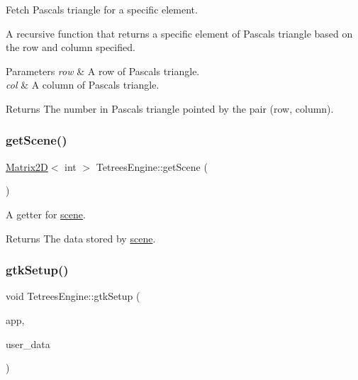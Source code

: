 Fetch Pascal\textquotesingle{}s triangle for a specific element. 

A recursive function that returns a specific element of Pascal\textquotesingle{}s triangle based on the row and column specified. 
\begin{DoxyParams}{Parameters}
{\em row} & A row of Pascal\textquotesingle{}s triangle. \\
\hline
{\em col} & A column of Pascal\textquotesingle{}s triangle. \\
\hline
\end{DoxyParams}
\begin{DoxyReturn}{Returns}
The number in Pascal\textquotesingle{}s triangle pointed by the pair (row, column). 
\end{DoxyReturn}
\mbox{\label{classTetreesEngine_a1f167b42fc077d496449a2cc959989ac}} 
\subsubsection{\texorpdfstring{get\+Scene()}{getScene()}}
{\footnotesize\ttfamily \hyperlink{classMatrix2D}{Matrix2D}$<$ int $>$ Tetrees\+Engine\+::get\+Scene (\begin{DoxyParamCaption}{ }\end{DoxyParamCaption})}

A getter for \hyperlink{classTetreesEngine_aeade477c0bc2eaaa894ebbdaca93584e}{scene}. \begin{DoxyReturn}{Returns}
The data stored by \hyperlink{classTetreesEngine_aeade477c0bc2eaaa894ebbdaca93584e}{scene}. 
\end{DoxyReturn}
\mbox{\label{classTetreesEngine_a85e0da200fb3e17745f1978d24acca2f}} 
\subsubsection{\texorpdfstring{gtk\+Setup()}{gtkSetup()}}
{\footnotesize\ttfamily void Tetrees\+Engine\+::gtk\+Setup (\begin{DoxyParamCaption}\item[{Gtk\+Application $\ast$}]{app,  }\item[{gpointer}]{user\+\_\+data }\end{DoxyParamCaption})}



